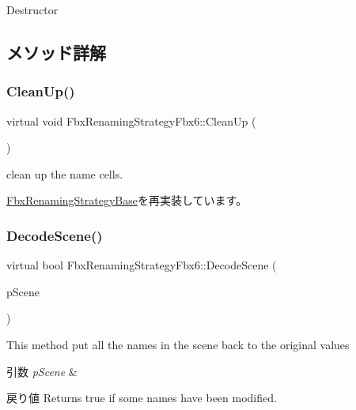 Destructor 



\subsection{メソッド詳解}
\mbox{\label{class_fbx_renaming_strategy_fbx6_acb37bd5bc46fdf1e4bf77d3db6654d45}} 
\subsubsection{\texorpdfstring{Clean\+Up()}{CleanUp()}}
{\footnotesize\ttfamily virtual void Fbx\+Renaming\+Strategy\+Fbx6\+::\+Clean\+Up (\begin{DoxyParamCaption}{ }\end{DoxyParamCaption})\hspace{0.3cm}{\ttfamily [virtual]}}



clean up the name cells. 



\hyperlink{class_fbx_renaming_strategy_base_ae1ab8784f6769fce3068ee21e3c34196}{Fbx\+Renaming\+Strategy\+Base}を再実装しています。

\mbox{\label{class_fbx_renaming_strategy_fbx6_a663b913a3f88b49e847f9c9c99ab16f2}} 
\subsubsection{\texorpdfstring{Decode\+Scene()}{DecodeScene()}}
{\footnotesize\ttfamily virtual bool Fbx\+Renaming\+Strategy\+Fbx6\+::\+Decode\+Scene (\begin{DoxyParamCaption}\item[{\hyperlink{class_fbx_scene}{Fbx\+Scene} $\ast$}]{p\+Scene }\end{DoxyParamCaption})\hspace{0.3cm}{\ttfamily [virtual]}}

This method put all the names in the scene back to the original values 
\begin{DoxyParams}{引数}
{\em p\+Scene} & \\
\hline
\end{DoxyParams}
\begin{DoxyReturn}{戻り値}
Returns true if some names have been modified. 
\end{DoxyReturn}


